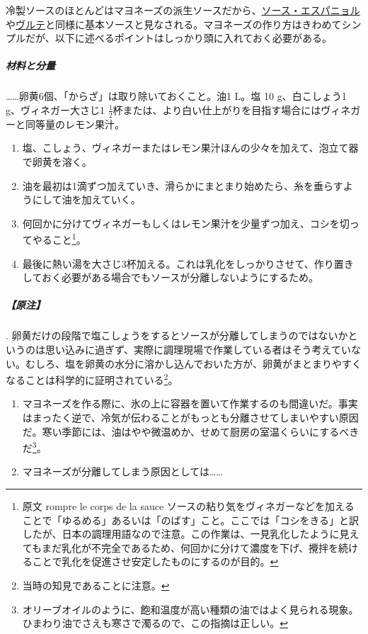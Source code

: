 \begin{recette}


冷製ソースのほとんどはマヨネーズの派生ソースだから、\protect\hyperlink{sauce-espagnole}{ソース・エスパニョル}や\protect\hyperlink{veloute}{ヴルテ}と同様に基本ソースと見なされる。マヨネーズの作り方はきわめてシンプルだが、以下に述べるポイントはしっかり頭に入れておく必要がある。

\hypertarget{proportions-mayonnaise}{%
\subparagraph{材料と分量}\label{proportions-mayonnaise}}

\ldots{}\ldots{}卵黄6個、「からざ」は取り除いておくこと。油1 L。塩 10
g、白こしょう1 g、ヴィネガー大さじ1
\(\frac{1}{2}\)杯または、より白い仕上がりを目指す場合にはヴィネガーと同等量のレモン果汁。

\begin{enumerate}
\def\labelenumi{\arabic{enumi}.}
\item
  塩、こしょう、ヴィネガーまたはレモン果汁ほんの少々を加えて、泡立て器で卵黄を溶く。
\item
  油を最初は1滴ずつ加えていき、滑らかにまとまり始めたら、糸を垂らすようにして油を加えていく。
\item
  何回かに分けてヴィネガーもしくはレモン果汁を少量ずつ加え、コシを切ってやること\footnote{原文
    rompre le corps de la sauce
    ソースの粘り気をヴィネガーなどを加えることで「ゆるめる」あるいは「のばす」こと。ここでは「コシをきる」と訳したが、日本の調理用語なので注意。この作業は、一見乳化したように見えてもまだ乳化が不完全であるため、何回かに分けて濃度を下げ、攪拌を続けることで乳化を促進させ安定したものにするのが目的。}。
\item
  最後に熱い湯を大さじ3杯加える。これは乳化をしっかりさせて、作り置きしておく必要がある場合でもソースが分離しないようにするため。
\end{enumerate}

\hypertarget{nota-mayonnaise}{%
\subparagraph{【原注】}\label{nota-mayonnaise}}

.
卵黄だけの段階で塩こしょうをするとソースが分離してしまうのではないかというのは思い込みに過ぎず、実際に調理現場で作業している者はそう考えていない。むしろ、塩を卵黄の水分に溶かし込んでおいた方が、卵黄がまとまりやすくなることは科学的に証明されている\footnote{当時の知見であることに注意。}。

\begin{enumerate}
\def\labelenumi{\arabic{enumi}.}
\setcounter{enumi}{1}
\item
  マヨネーズを作る際に、氷の上に容器を置いて作業するのも間違いだ。事実はまったく逆で、冷気が伝わることがもっとも分離させてしまいやすい原因だ。寒い季節には、油はやや微温めか、せめて厨房の室温くらいにするべきだ\footnote{オリーブオイルのように、飽和温度が高い種類の油ではよく見られる現象。ひまわり油でさえも寒さで濁るので、この指摘は正しい。}。
\item
  マヨネーズが分離してしまう原因としては\ldots{}\ldots{}


\end{enumerate}
\end{recette}
